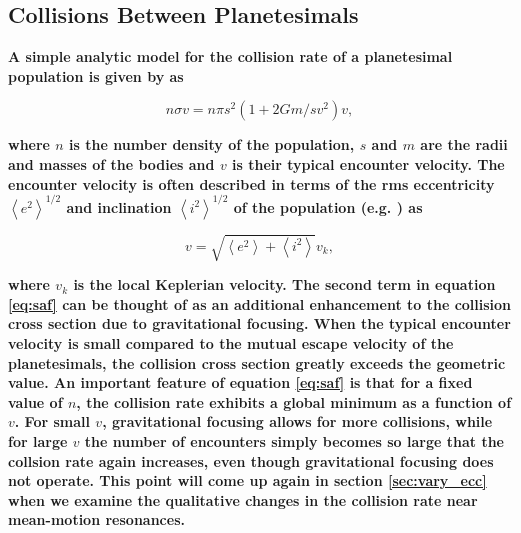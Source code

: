 \documentclass[fleqn,usenatbib]{mnras}
\begin{document}

\subsection{Collisions Between Planetesimals}\label{sec:colleq}

\textbf{A simple analytic model for the collision rate of a planetesimal population is given by \citet{1969edo..book.....S} as}

\begin{equation}\label{eq:saf}
	n \sigma v = n \pi s^{2} \left( 1 + 2 G m / s v^{2} \right) v,
\end{equation}

\noindent\textbf{where $n$ is the number density of the population, $s$ and $m$ are the radii and masses of the bodies and $v$ is their typical encounter velocity. The encounter velocity is often described in terms of the rms eccentricity $\left<e^{2}\right>^{1/2}$ and inclination $\left<i^{2}\right>^{1/2}$ of the population (e.g. \citet{1993ARA&A..31..129L}) as}

\begin{equation}\label{eq:eccincvel}
	v = \sqrt{\left< e^{2} \right> + \left< i^{2} \right>} v_{k},
\end{equation}

\noindent\textbf{where $v_{k}$ is the local Keplerian velocity. The second term in equation \ref{eq:saf} can be thought of as an additional enhancement to the collision cross section due to gravitational focusing. When the typical encounter velocity is small compared to the mutual escape velocity of the planetesimals, the collision cross section greatly exceeds the geometric value. An important feature of equation \ref{eq:saf} is that for a fixed value of $n$, the collision rate exhibits a global minimum as a function of $v$. For small $v$, gravitational focusing allows for more collisions, while for large $v$ the number of encounters simply becomes so large that the collsion rate again increases, even though gravitational focusing does not operate. This point will come up again in section \ref{sec:vary_ecc} when we examine the qualitative changes in the collision rate near mean-motion resonances.}
\end{document}
